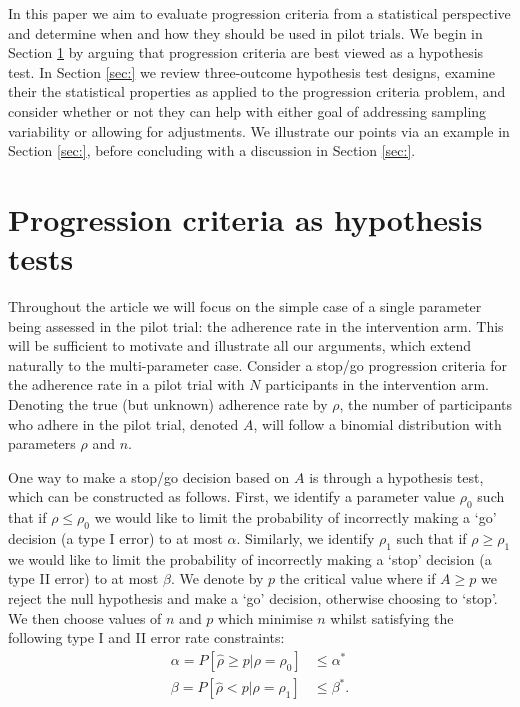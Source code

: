 \documentclass[sagev, Crown]{sagej} %
\begin{document}
In this paper we aim to evaluate progression criteria from a statistical perspective and determine when and how they should be used in pilot trials. We begin in Section \ref{sec:tests} by arguing that progression criteria are best viewed as a hypothesis test. In Section \ref{sec:} we review three-outcome hypothesis test designs, examine their the statistical properties as applied to the progression criteria problem, and consider whether or not they can help with either goal of addressing sampling variability or allowing for adjustments. We illustrate our points via an example in Section \ref{sec:}, before concluding with a discussion in Section \ref{sec:}.

\section{Progression criteria as hypothesis tests}\label{sec:tests}

Throughout the article we will focus on the simple case of a single parameter being assessed in the pilot trial: the adherence rate in the intervention arm. This will be sufficient to motivate and illustrate all our arguments, which extend naturally to the multi-parameter case. Consider a stop/go progression criteria for the adherence rate in a pilot trial with $N$ participants in the intervention arm. Denoting the true (but unknown) adherence rate by $\rho$, the number of participants who adhere in the pilot trial, denoted $A$, will follow a binomial distribution with parameters $\rho$ and $n$. %

One way to make a stop/go decision based on $A$ is through a hypothesis test, which can be constructed as follows. First, we identify a parameter value $\rho_0$ such that if $\rho \leq \rho_0$ we would like to limit the probability of incorrectly making a `go' decision (a type I error) to at most $\alpha$. Similarly, we identify $\rho_1$ such that if $\rho \geq \rho_1$ we would like to limit the probability of incorrectly making a `stop' decision (a type II error) to at most $\beta$. We denote by $p$ the critical value where if $A \geq p$ we reject the null hypothesis and make a `go' decision, otherwise choosing to `stop'. We then choose values of $n$ and $p$ which minimise $n$ whilst satisfying the following type I and II error rate constraints:
\begin{align}
\alpha = P[ \hat{\rho} \geq p | \rho = \rho_0] & \leq \alpha^* \\
\beta = P[ \hat{\rho} < p | \rho = \rho_1] & \leq \beta^*.
\end{align} 
\end{document}

